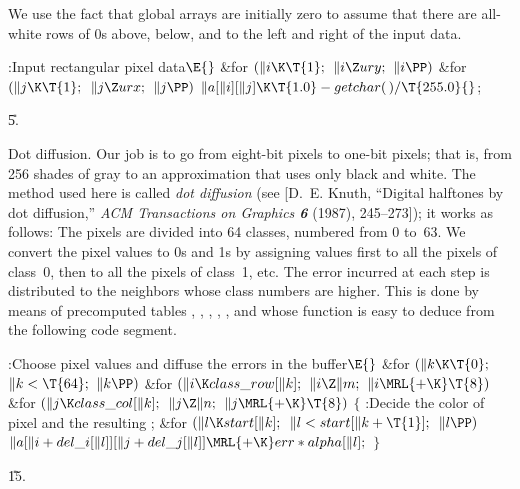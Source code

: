 We use the fact that global arrays are initially zero to assume that
there are all-white rows of 0s above, below, and to the left and right
of the input data.

\Y\B\4:Input rectangular pixel data\X${}\E{}$\6
\&{for} ${}(\|i\K\T{1};{}$ ${}\|i\Z\\{ury};{}$ ${}\|i\PP){}$\1\6
\&{for} ${}(\|j\K\T{1};{}$ ${}\|j\Z\\{urx};{}$ ${}\|j\PP){}$\1\5
${}\|a[\|i][\|j]\K\T{1.0}-\\{getchar}(\,)/\T{255.0}{}$;\2\2\par
\U5.\fi

Dot diffusion. Our job is to go from eight-bit pixels
to one-bit pixels;
that is, from 256 shades of gray to an approximation that uses only
black and white. The method used here is called {\it dot diffusion\/}
(see [D.~E. Knuth, ``Digital halftones by dot diffusion,'' {\sl ACM
Transactions on Graphics\/ \bf6} (1987), 245--273]); it works as follows:
The pixels are divided into 64 classes, numbered from 0 to~63. We convert the
pixel values to 0s and 1s by assigning values first to all the pixels of
class~0, then to all the pixels of class~1, etc. The error incurred at each
step is distributed to the neighbors whose class numbers are higher. This is
done by means of precomputed tables , , %
,
, , and  whose function is easy to
deduce from the
following code segment.

\Y\B\4:Choose pixel values and diffuse the errors in the buffer\X${}\E{}$\6
\&{for} ${}(\|k\K\T{0};{}$ ${}\|k<\T{64};{}$ ${}\|k\PP){}$\1\6
\&{for} ${}(\|i\K\\{class\_row}[\|k];{}$ ${}\|i\Z\|m;{}$ ${}\|i\MRL{+{\K}}%
\T{8}){}$\1\6
\&{for} ${}(\|j\K\\{class\_col}[\|k];{}$ ${}\|j\Z\|n;{}$ ${}\|j\MRL{+{\K}}%
\T{8}){}$\5
${}\{{}$\1\6
:Decide the color of pixel \PB{$[\|i,\|j]$} and the resulting %
\X;\6
\&{for} ${}(\|l\K\\{start}[\|k];{}$ ${}\|l<\\{start}[\|k+\T{1}];{}$ ${}\|l%
\PP){}$\1\5
${}\|a[\|i+\\{del\_i}[\|l]][\|j+\\{del\_j}[\|l]]\MRL{+{\K}}\\{err}*\\{alpha}[%
\|l];{}$\2\6
\4${}\}{}$\2\2\2\par
\U15.\fi

